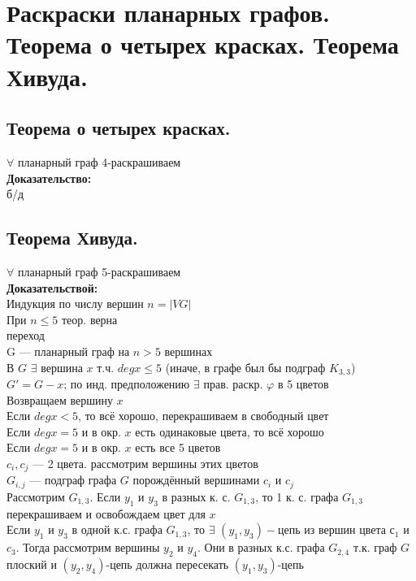 \documentclass[12pt]{article}
\begin{document}
\section{Раскраски планарных графов. Теорема о четырех красках. Теорема Хивуда.}
\subsection{Теорема о четырех красках.}
	$\forall$ планарный граф 4-раскрашиваем\\
	\textbf{Доказательство:}\\
	б/д\\
	\qedsymbol
\subsection{Теорема Хивуда.}
	$\forall$ планарный граф 5-раскрашиваем\\
	\textbf{Доказательствой:}\\
		Индукция по числу вершин $n = |VG|$\\
		При $n \leqslant 5$ теор. верна\\
		переход\\
		G — планарный граф на $n > 5$ вершинах\\
		В $G$ $\exists$ вершина $x$ т.ч. $deg x \leqslant 5$ (иначе, в графе был бы подграф $K_{3,3}$)\\
		$G' = G - x$; по инд. предположению $\exists$ прав. раскр. $\varphi$ в 5 цветов\\
		Возвращаем вершину $x$\\
		Если $deg x < 5$, то всё хорошо, перекрашиваем в свободный цвет\\
		Если $deg x = 5$ и в окр. $x$ есть одинаковые цвета, то всё хорошо\\
		Если $deg x = 5$  и в окр. $x$ есть все 5 цветов\\
		$c_i, c_j$ — 2 цвета. рассмотрим вершины этих цветов\\
		$G_{i,j}$ — подграф графа $G$ порождённый вершинами $c_i$ и $c_j$\\
		Рассмотрим $G_{1,3}$. Если $y_1$ и $y_3$ в разных к. с. $G_{1,3}$, то 1 к. с. графа $G_{1,3}$ перекрашиваем и освобождаем цвет для $x$\\
		Если $y_1$ и $y_3$ в одной к.с. графа $G_{1,3}$, то $\exists$ $(y_1,y_3)-$цепь из вершин цвета $с_1$ и $c_3$. Тогда рассмотрим вершины $y_2$ и $y_4$. Они в разных к.с. графа $G_{2,4}$ т.к. граф $G$ плоский и $(y_2,y_4)$-цепь должна пересекать $(y_1,y_3)$-цепь\\
		\qedsymbol 
\end{document}
